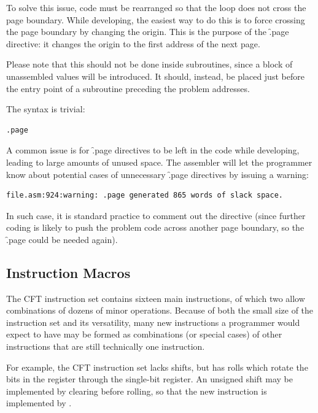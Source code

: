 To solve this issue, code must be rearranged so that the loop does not cross
the page boundary. While developing, the easiest way to do this is to force
crossing the page boundary by changing the origin. This is the purpose of the
\f{.page} directive: it changes the origin to the first address of the next
page.

Please note that this should not be done inside subroutines, since a block of
unassembled values will be introduced. It should, instead, be placed just
before the entry point of a subroutine preceding the problem addresses.

The syntax is trivial:

\begin{lstlisting}[language=cftasm,numbers=none]
.page
\end{lstlisting}

A common issue is for \f{.page} directives to be left in the code while
developing, leading to large amounts of unused space. The assembler will let
the programmer know about potential cases of unnecessary \f{.page} directives
by issuing a warning:

\begin{lstlisting}[numbers=none]
file.asm:924:warning: .page generated 865 words of slack space.
\end{lstlisting}

In such case, it is standard practice to comment out the directive (since
further coding is likely to push the problem code across another page boundary,
so the \f{.page} could be needed again).



\subsection{Instruction Macros}

The CFT instruction set contains sixteen main instructions, of which two allow
combinations of dozens of minor operations. Because of both the small size of
the instruction set and its versatility, many new instructions a programmer
would expect to have may be formed as combinations (or special cases) of other
instructions that are still technically one instruction.

For example, the CFT instruction set lacks shifts, but has rolls which rotate
the bits in the \AC{} register through the single-bit \Lreg{} register. An
unsigned shift may be implemented by clearing \Lreg{} before rolling, so that
the new instruction  is implemented by .

